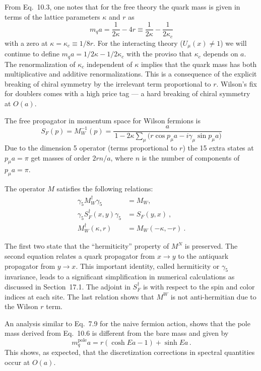 From Eq.~10.3, one notes that for the free theory the quark mass is given in
terms of the lattice parameters $\kappa$ and $r$ as
\begin{equation}
m_q a = \frac{1}{2\kappa} - 4r \equiv \frac{1}{2\kappa} - \frac{1}{2\kappa_c}
\end{equation}
with a zero at $\kappa = \kappa_c \equiv 1/8r$.  For the interacting theory
($U_\mu(x) \neq 1$) we will continue to define $m_q a = 1/2\kappa - 1/2\kappa_c$
with the proviso that $\kappa_c$ depends on $a$.  The renormalization of
$\kappa_c$ independent of $\kappa$ implies that the quark mass has both
multiplicative and additive renormalizations.  This is a consequence of the
explicit breaking of chiral symmetry by the irrelevant term proportional to
$r$.  Wilson's fix for doublers comes with a high price tag --- a hard breaking
of chiral symmetry at $O(a)$.

The free propagator in momentum space for Wilson fermions is
\begin{equation}
S_F(p) = M_W^{-1}(p) = \frac{a}{\,1 - 2\kappa \sum_\mu \bigl( r \cos p_\mu a - i\gamma_\mu \sin p_\mu a \bigr)}
\end{equation}
Due to the dimension 5 operator (terms proportional to $r$) the 15 extra states
at $p_\mu a = \pi$ get masses of order $2rn/a$, where $n$ is the number of
components of $p_\mu a = \pi$.

The operator $M$ satisfies the following relations:
\begin{align}
\gamma_5 M_W^\dagger \gamma_5 &= M_W, \nonumber\\
\gamma_5 S_F^\dagger (x,y) \gamma_5 &= S_F (y,x) \ , \nonumber\\
M_W^\dagger (\kappa, r) &= M_W (-\kappa, -r) \ .
\end{align}

The first two state that the ``hermiticity'' property of $M^N$ is preserved.
The second equation relates a quark propagator from $x \to y$ to the antiquark
propagator from $y \to x$.  This important identity, called hermiticity or
$\gamma_5$ invariance, leads to a significant simplification in numerical
calculations as discussed in Section~17.1.  The adjoint in $S_F^\dagger$ is
with respect to the spin and color indices at each site.  The last relation
shows that $M^W$ is not anti-hermitian due to the Wilson $r$ term.

An analysis similar to Eq.~7.9 for the naive fermion action, shows that the
pole mass derived from Eq.~10.6 is different from the bare mass and given by
\begin{equation}
m_q^{\mathrm{pole}} a = r(\cosh Ea - 1) + \sinh Ea \,.
\end{equation}
This shows, as expected, that the discretization corrections in spectral
quantities occur at $O(a)$.

